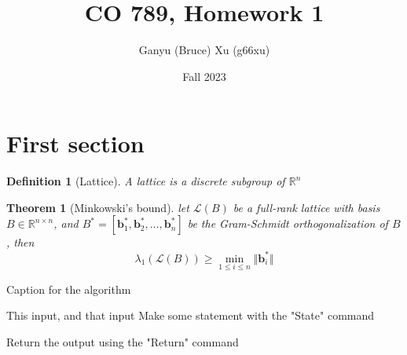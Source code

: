 \documentclass{article}
\title{CO 789, Homework 1}
\author{Ganyu (Bruce) Xu (g66xu)}
\date{Fall 2023}
\newcommand{\norm}[1]{\Vert {#1} \Vert}
\newtheorem{definition}{Definition}[section]
\newtheorem{theorem}{Theorem}[section]
\begin{document}
\maketitle

\section{First section}
\begin{definition}[Lattice]\label{lattice-def}
A lattice is a discrete subgroup of $\mathbb{R}^n$
\end{definition}

\begin{theorem}[Minkowski's bound]
    let $\mathcal{L}(B)$ be a full-rank lattice with basis $B \in \mathbb{R}^{n \times n}$, and $B^\ast = [\mathbf{b}_1^\ast, \mathbf{b}_2^\ast, \ldots, \mathbf{b}_n^\ast]$ be the Gram-Schmidt orthogonalization of $B$, then
    \begin{equation}
        \lambda_1(\mathcal{L}(B)) \geq \min_{1 \leq i \leq n}\norm{\mathbf{b}_i^\ast}
    \end{equation}
\end{theorem}

\begin{algorithm}
\caption{Caption for the algorithm}\label{alg:cap}
\begin{algorithmic}[1]  %
    \Require This input, and that input
    \State Make some statement with the "State" command

    \EndFor

    \EndWhile

    \Else
    \EndIf

    \Return Return the output using the "Return" command

\end{algorithmic}
\end{algorithm}
\end{document}
